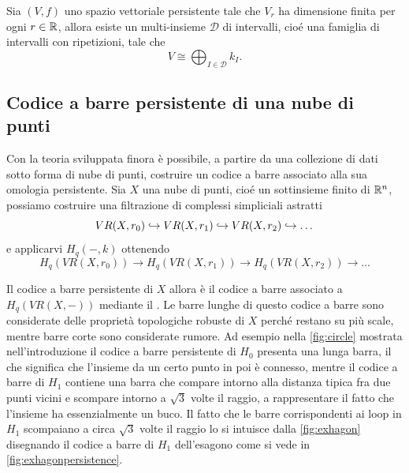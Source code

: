 \begin{theorem}\label{thm:persistentdecomposition}
  Sia $(V,f)$ uno spazio vettoriale persistente tale che $V_r$ ha dimensione finita per ogni $r\in\mathbb{R}$, allora esiste un
  multi-insieme $\mathcal{D}$ di intervalli, cioé una famiglia di intervalli con ripetizioni, tale che
  \begin{equation*}
    V\cong \bigoplus_{I\in\mathcal{D}} k_I.
  \end{equation*}
\end{theorem}

\subsection{Codice a barre persistente di una nube di punti}

Con la teoria sviluppata finora è possibile, a partire da una collezione di dati sotto forma di nube di punti, costruire un codice a barre associato alla sua omologia persistente. Sia $X$ una nube di punti, cioé un sottinsieme finito di $\mathbb{R}^n$, possiamo costruire una filtrazione di complessi simpliciali astratti
\begin{equation*}
  VR(X,r_0)\hookrightarrow VR(X,r_1)\hookrightarrow VR(X,r_2)\hookrightarrow \dots
\end{equation*}
e applicarvi $H_q(-,k)$ ottenendo
\begin{equation*}
  H_q(VR(X,r_0))\to H_q(VR(X,r_1))\to H_q(VR(X,r_2))\to \dots
\end{equation*}

Il codice a barre persistente di $X$ allora è il codice a barre associato a $H_q(VR(X,-))$ mediante il . Le barre lunghe di questo codice a barre sono considerate delle proprietà topologiche robuste di $X$ perché restano su più scale, mentre barre corte sono considerate rumore. Ad esempio nella \cref{fig:circle} mostrata nell'introduzione il codice a barre persistente di $H_0$ presenta una lunga barra, il che significa che l'insieme da un certo punto in poi è connesso, mentre il codice a barre di $H_1$ contiene una barra che compare intorno alla distanza tipica fra due punti vicini e scompare intorno a $\sqrt{3}$ volte il raggio, a rappresentare il fatto che l'insieme ha essenzialmente un buco. Il fatto che le barre corrispondenti ai loop in $H_1$ scompaiano a circa $\sqrt{3}$ volte il raggio lo si intuisce dalla \cref{fig:exhagon} disegnando il codice a barre di $H_1$ dell'esagono come si vede in \cref{fig:exhagonpersistence}.

